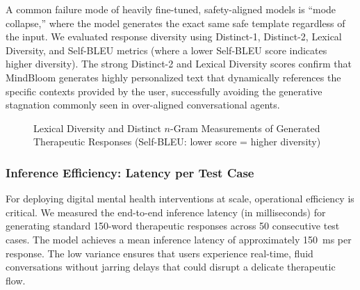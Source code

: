 \documentclass[12pt,twoside]{article}
\begin{document}
A common failure mode of heavily fine-tuned, safety-aligned models is ``mode collapse,'' where the model generates the exact same safe template regardless of the input. We evaluated response diversity using Distinct-1, Distinct-2, Lexical Diversity, and Self-BLEU metrics (where a lower Self-BLEU score indicates higher diversity). The strong Distinct-2 and Lexical Diversity scores confirm that MindBloom generates highly personalized text that dynamically references the specific contexts provided by the user, successfully avoiding the generative stagnation commonly seen in over-aligned conversational agents.

\begin{figure}[H]
\centering
{}
\caption{Lexical Diversity and Distinct $n$-Gram Measurements of Generated Therapeutic Responses (Self-BLEU: lower score = higher diversity)}
\label{fig:diversity}
\end{figure}

\subsubsection{Inference Efficiency: Latency per Test Case}

For deploying digital mental health interventions at scale, operational efficiency is critical. We measured the end-to-end inference latency (in milliseconds) for generating standard 150-word therapeutic responses across 50 consecutive test cases. The model achieves a mean inference latency of approximately 150~ms per response. The low variance ensures that users experience real-time, fluid conversations without jarring delays that could disrupt a delicate therapeutic flow.
\end{document}
